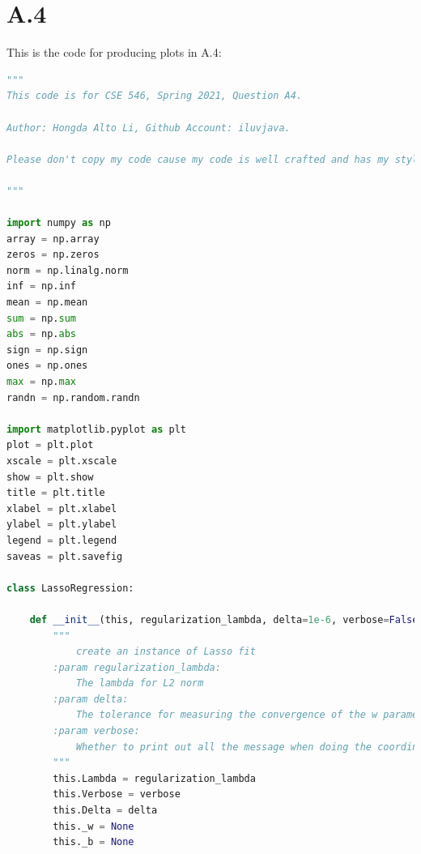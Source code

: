 \documentclass[]{article}
\begin{document}
\section*{A.4}
    This is the code for producing plots in A.4: 
    \begin{lstlisting}[language=python]
"""
This code is for CSE 546, Spring 2021, Question A4.

Author: Hongda Alto Li, Github Account: iluvjava.

Please don't copy my code cause my code is well crafted and has my style in it.

"""

import numpy as np
array = np.array
zeros = np.zeros
norm = np.linalg.norm
inf = np.inf
mean = np.mean
sum = np.sum
abs = np.abs
sign = np.sign
ones = np.ones
max = np.max
randn = np.random.randn

import matplotlib.pyplot as plt
plot = plt.plot
xscale = plt.xscale
show = plt.show
title = plt.title
xlabel = plt.xlabel
ylabel = plt.ylabel
legend = plt.legend
saveas = plt.savefig

class LassoRegression:

    def __init__(this, regularization_lambda, delta=1e-6, verbose=False):
        """
            create an instance of Lasso fit
        :param regularization_lambda:
            The lambda for L2 norm
        :param delta:
            The tolerance for measuring the convergence of the w parameter for coordinate descend.
        :param verbose:
            Whether to print out all the message when doing the coordinate descned.
        """
        this.Lambda = regularization_lambda
        this.Verbose = verbose
        this.Delta = delta
        this._w = None
        this._b = None


\end{lstlisting}
\end{document}
